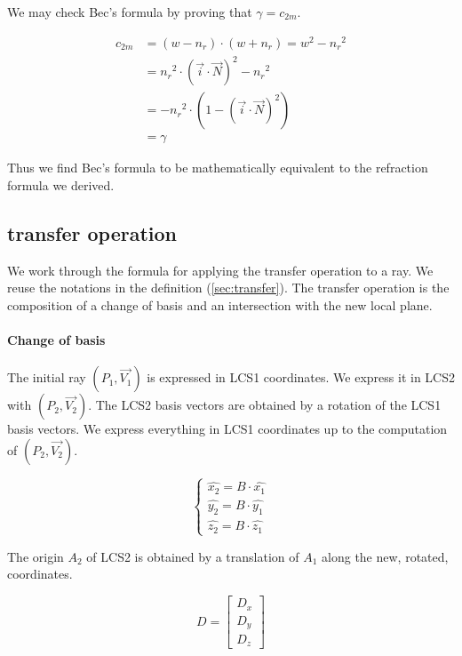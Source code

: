 We may check Bec's formula by proving that $\gamma = c_{2m}$.

\begin{equation} \begin{split}
c_{2m} &= (w - n_r) \cdot (w + n_r) = w^2 - {n_r}^2 \\
       &= {n_r}^2 \cdot
          \left( \overrightarrow{i} \cdot \overrightarrow{N} \right)^2
          - {n_r}^2 \\
       &= -{n_r}^2 \cdot
           \left(1 - \left(\overrightarrow{i} \cdot
                     \overrightarrow{N}\right)^2\right) \\
       &= \gamma
\end{split} \end{equation}

Thus we find Bec's formula to be mathematically equivalent to the refraction
formula we derived.

\subsection{transfer operation}
We work through the formula for applying the transfer operation to a ray.
We reuse the notations in the definition (\cref{sec:transfer}). The transfer
operation is the composition of a change of basis and an intersection with
the new local plane.

\paragraph{Change of basis}
The initial ray $(P_1, \overrightarrow{V_1})$ is expressed in LCS1 coordinates.
We express it in LCS2 with $(P_2, \overrightarrow{V_2})$. The LCS2 basis vectors
are obtained by a rotation of the LCS1 basis vectors. We express everything
in LCS1 coordinates up to the computation of $(P_2, \overrightarrow{V_2})$.

\begin{equation} \begin{cases}
\hat{x_2} = B \cdot \hat{x_1} \\
\hat{y_2} = B \cdot \hat{y_1} \\
\hat{z_2} = B \cdot \hat{z_1}
\end{cases} \end{equation}

The origin $A_2$ of LCS2 is obtained by a translation of $A_1$ along
the new, rotated, coordinates.

\begin{equation}
D = \begin{bmatrix} D_x \\ D_y \\ D_z \end{bmatrix}
\end{equation}

